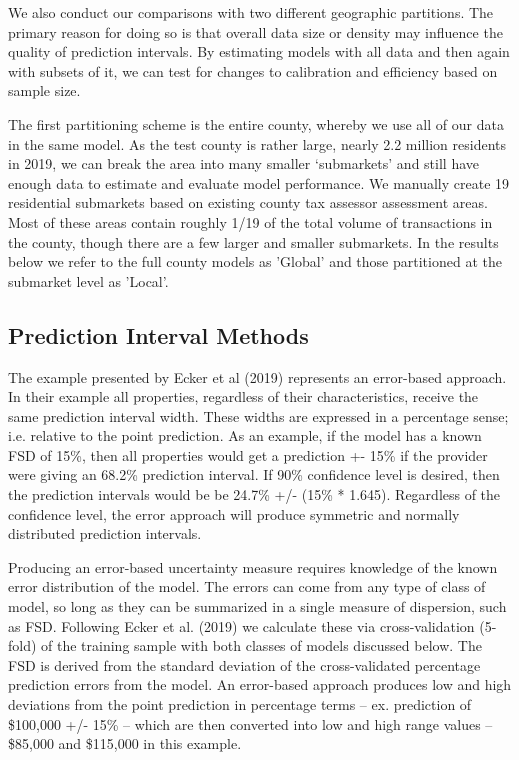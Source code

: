 \documentclass[colTwo]{anon}
\theoremstyle{definition}
\begin{document}
We also conduct our comparisons with two different geographic partitions.  The primary reason for doing so is that overall data size or density may influence the quality of prediction intervals.  By estimating models with all data and then again with subsets of it, we can test for changes to calibration and efficiency based on sample size.

The first partitioning scheme is the entire county, whereby we use all of our data in the same model.  As the test county is rather large, nearly 2.2 million residents in 2019, we can break the area into many smaller ‘submarkets’ and still have enough data to estimate and evaluate model performance.  We manually create 19 residential submarkets based on existing county tax assessor assessment areas.  Most of these areas contain roughly 1/19 of the total volume of transactions in the county, though there are a few larger and smaller submarkets. In the results below we refer to the full county models as 'Global' and those partitioned at the submarket level as 'Local'.

\subsection{Prediction Interval Methods}

The example presented by Ecker et al (2019) represents an error-based approach. In their example all properties, regardless of their characteristics, receive the same prediction interval width.  These widths are expressed in a percentage sense; i.e. relative to the point prediction. As an example,  if the model has a known FSD of 15\%, then all properties would get a prediction +- 15\% if the provider were giving an 68.2\% prediction interval.  If 90\% confidence level is desired, then the prediction intervals would be be 24.7\% +/- (15\% * 1.645).  Regardless of the confidence level, the error approach will produce symmetric and normally distributed prediction intervals.

Producing an error-based uncertainty measure requires knowledge of the known error distribution of the model. The errors can come from any type of class of model, so long as they can be summarized in a single measure of dispersion, such as FSD. Following Ecker et al. (2019) we calculate these via cross-validation (5-fold) of the training sample with both classes of models discussed below. The FSD is derived from the standard deviation of the cross-validated percentage prediction errors from the model. An error-based approach produces low and high deviations from the point prediction in percentage terms -- ex. prediction of \$100,000 +/- 15\% -- which are then converted into low and high range values -- \$85,000 and \$115,000 in this example.
\end{document}
